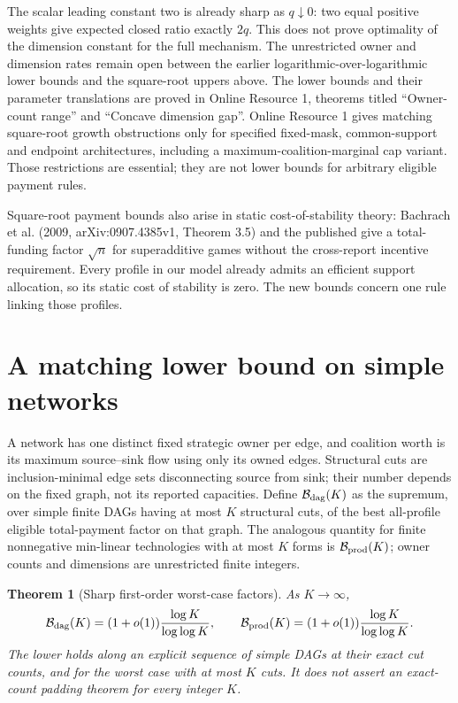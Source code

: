 \documentclass[11pt]{article}
\newtheorem{theorem}{Theorem}[section]
\theoremstyle{definition}\newtheorem{definition}[theorem]{Definition}
\theoremstyle{remark}\newtheorem{remark}[theorem]{Remark}
\begin{document}
The scalar leading constant two is already sharp as $q\downarrow0$:
two equal positive weights give expected closed ratio exactly $2q$.
This does not prove optimality of the dimension constant for the full mechanism.
The unrestricted owner and dimension rates remain open between the earlier
logarithmic-over-logarithmic lower bounds and the square-root uppers above.
The lower bounds and their parameter translations are proved in Online
Resource 1, theorems titled ``Owner-count range'' and ``Concave dimension gap''.
Online Resource 1 gives matching square-root growth obstructions only for
specified fixed-mask, common-support and endpoint architectures, including
a maximum-coalition-marginal cap variant. Those restrictions are essential;
they are not lower bounds for arbitrary eligible payment rules.

Square-root payment bounds also arise in static cost-of-stability theory:
Bachrach et al. (2009, arXiv:0907.4385v1, Theorem 3.5) and the published
\citet[Theorem 7]{Bachrach} give a total-funding factor $\sqrt n$ for
superadditive games without the cross-report incentive requirement. Every profile in our
model already admits an efficient support allocation, so its static cost of
stability is zero. The new bounds concern one rule linking those profiles.

\section{A matching lower bound on simple networks}\label{dag:section}
A network has one distinct fixed strategic owner per edge, and coalition
worth is its maximum source--sink flow using only its owned edges. Structural
cuts are inclusion-minimal edge sets disconnecting source from sink; their
number depends on the fixed graph, not its reported capacities. Define
$\mathcal B_{\rm dag}(K)$ as the supremum, over simple finite DAGs having at
most $K$ structural cuts, of the best all-profile eligible total-payment
factor on that graph. The analogous quantity for finite nonnegative
min-linear technologies with at most $K$ forms is $\mathcal B_{\rm prod}(K)$;
owner counts and dimensions are unrestricted finite integers.

\begin{theorem}[Sharp first-order worst-case factors]\label{dag:sharp}
As $K\to\infty$,
\[
 \mathcal B_{\rm dag}(K)=(1+o(1))\frac{\log K}{\log\log K},\qquad
 \mathcal B_{\rm prod}(K)=(1+o(1))\frac{\log K}{\log\log K}.
\]
The lower holds along an explicit sequence of simple DAGs at their exact cut
counts, and for the worst case with \emph{at most} $K$ cuts. It does not
assert an exact-count padding theorem for every integer $K$.
\end{theorem}
\end{document}
